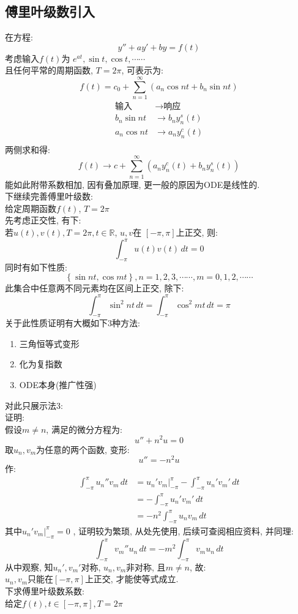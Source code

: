\subsection{\LARGE 傅里叶级数引入}
在方程:
\[ y''  + a y' + b y = f(t) \]
考虑输入$f(t)$为 $e^{a t}, \sin t, \cos t, \cdots \cdots  $\\
且任何平常的周期函数, $T = 2 \pi$, 可表示为:
\[ f(t) = c_0 + \sum_{n = 1}^{\infty} (a_n \cos nt  + b_n \sin nt) \] 
\begin{align*}
   \text{输入}  &\to \text{响应}  \\
   b_n \sin nt  &\to b_n y_n^{s}(t)   \\
   a_n \cos nt  &\to a_n y_n^{c}(t) \\      
\end{align*}
两侧求和得:
\[ f(t) \to   c + \sum_{n = 1}^{\infty} (a_n y_n^{c}(t) + b_n y_n^{s}(t)) \]
能如此附带系数相加, 因有叠加原理, 更一般的原因为ODE是线性的.\\
下继续完善傅里叶级数:\\
给定周期函数$f(t)$, $  T = 2 \pi $\\
先考虑正交性, 有下:\\
若$u(t), v(t), T = 2 \pi, t \in \mathbb{R} $, 
$u , v$在 $[- \pi ,  \pi]$上正交, 则:
\[ \int_{- \pi}^{\pi} u(t) v(t) \,dt = 0 \] 
同时有如下性质:
\[ \left\{ \sin nt , \cos mt \right\} , n = 1, 2, 3, \cdots \cdots  , m = 0, 1, 2, \cdots \cdots   \] 
此集合中任意两不同元素均在区间上正交, 除下:
\[
\int_{- \pi}^{\pi} \sin^2 nt \,dt = \int_{- \pi}^{\pi} \cos^2 mt \,dt = \pi
\]
关于此性质证明有大概如下3种方法:
\begin{enumerate}
    \item 三角恒等式变形
    \item 化为复指数
    \item ODE本身(推广性强)
\end{enumerate}
对此只展示法3:\\
证明:\\
假设$m \neq n$, 满足的微分方程为:
\[ u'' + n^2 u = 0 \]
取$u_n, v_m$为任意的两个函数, 变形:
\[ u'' = -n^2 u \]
作:
\begin{align*}
   \int_{- \pi}^{\pi} u_n'' v_m \,dt &= u_n' v_m \vert _{-\pi}^{\pi} - \int_{- \pi}^{\pi} u_n' v_m' \,dt  \\
    &= - \int_{- \pi}^{\pi} u_n' v_m' \,dt   \\
    &= - n^2 \int_{- \pi}^{\pi}  u_n v_m \,dt     
\end{align*}
其中$u_n' v_m \vert _{-\pi}^{\pi} = 0$ , 证明较为繁琐, 从处先使用, 后续可查阅相应资料, 并同理:
\[ \int_{- \pi}^{\pi} v_m'' u_n \,dt = - m^2 \int_{- \pi}^{\pi}  v_m u_n \,dt \]
从中观察, 知$u_n',  v_m'$对称, $u_n, v_m$非对称, 且$m \neq n$, 故:\\
$u_n, v_m$只能在$[- \pi, \pi]$上正交, 才能使等式成立.\\
下求傅里叶级数系数:\\
给定$f(t), t \in [- \pi, \pi] , T = 2 \pi $

